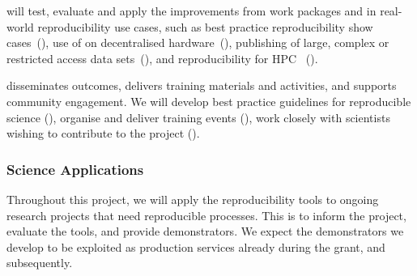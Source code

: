      will test, evaluate and apply the improvements from
    work packages  and  in real-world
    reproducibility use cases, such as best practice reproducibility show
    cases~(), use of \repotodocker{} on
    decentralised hardware~(), publishing
    of large, complex or restricted access data
    sets~(), and reproducibility for HPC~
    ().

     disseminates outcomes, delivers training materials
    and activities, and supports community engagement. We will develop best practice guidelines for reproducible
    science (), organise and deliver
    training events (), work closely with
    scientists wishing to contribute to the project ().

    \subsubsection{Science Applications}\label{sec:science-applications}
    Throughout this project, we will apply the reproducibility tools to ongoing
    research projects that need reproducible processes. This is to inform the
    project, evaluate the tools, and provide demonstrators. We expect the
    demonstrators we develop to be exploited as production services already during
    the grant, and subsequently.
    
